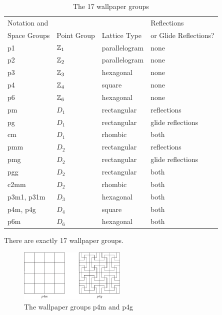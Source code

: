 \begin{table}[htb]
\caption{The 17 wallpaper groups}{\small
\begin{center}
\begin{tabular}{|l|l|l|l|}
\hline
Notation and &             &              & Reflections  \\
Space Groups & Point Group & Lattice Type & or Glide Reflections? \\
\hline
p1 & ${\Bbb Z}_1$ & parallelogram & none \\
p2 & ${\Bbb Z}_2$ & parallelogram & none \\
p3 & ${\Bbb Z}_3$ & hexagonal & none \\
p4 & ${\Bbb Z}_4$ & square & none \\
p6 & ${\Bbb Z}_6$ & hexagonal & none \\
pm & $D_1$ & rectangular & reflections \\
pg & $D_1$ & rectangular & glide reflections\\
cm & $D_1$ & rhombic & both \\
pmm & $D_2$ & rectangular & reflections \\
pmg & $D_2$ & rectangular & glide reflections \\
pgg & $D_2$ & rectangular & both \\
c2mm & $D_2$ & rhombic & both \\
p3m1, p31m & $D_3$ & hexagonal & both \\
p4m, p4g & $D_4$ & square & both \\
p6m & $D_6$ & hexagonal & both \\
\hline
\end{tabular}
\end{center}
}
\end{table}
 
 
\begin{theorem}
There are exactly 17 wallpaper groups.
\end{theorem}
 
 
\begin{figure}[htb]
\begin{center}
\centerline {
\includegraphics[width=2in]{p4m}
}
\end{center}
\caption{The wallpaper groups p4m and  p4g}
\label{p4m}
\end{figure}
 
